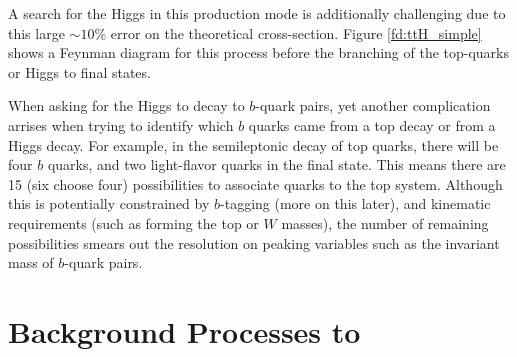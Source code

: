 \noindent A search for the Higgs in this production mode is
additionally challenging due to this large $\sim10\%$ error on the
theoretical cross-section.  Figure \ref{fd:ttH_simple} shows a Feynman
diagram for this process before the branching of the top-quarks or
Higgs to final states.  

\par When asking for the Higgs to decay to $b$-quark
pairs, yet another complication arrises when trying to identify which
$b$ quarks came from a top decay or from a Higgs decay.  For example, in
the semileptonic decay of top quarks, there will be four $b$ quarks, and
two light-flavor quarks in the final state.  This means there are 15
(six choose four) possibilities to associate quarks to the top
system.  Although this is potentially constrained by $b$-tagging (more
on this later), and kinematic requirements (such as forming the top or $W$ masses), the
number of remaining possibilities smears out the resolution on peaking
variables such as the invariant mass of $b$-quark pairs.  


\section{Background Processes to \ttH}
\label{ttH_backgrounds_overview}

